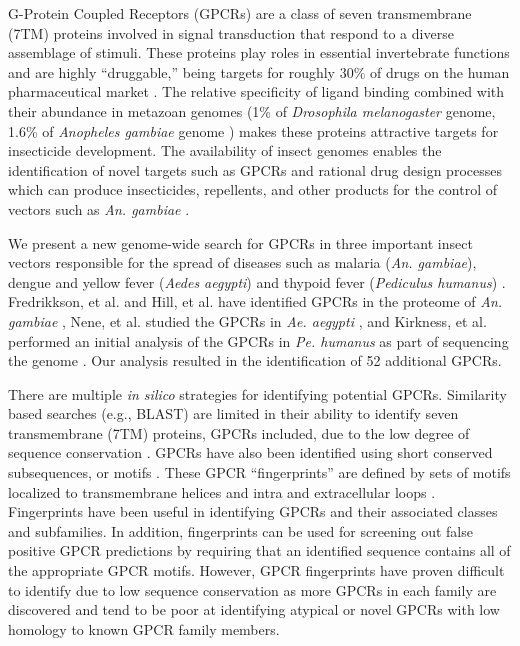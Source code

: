 G-Protein Coupled Receptors (GPCRs) are a class of seven transmembrane (7TM) proteins involved in signal transduction \cite{Pierce2002, Broeck2001} that respond to a diverse assemblage of stimuli.  These proteins play roles in essential invertebrate functions and are highly ``druggable,'' being targets for roughly 30\% of drugs on the human pharmaceutical market \cite{Wise2002}. The relative specificity of ligand binding combined with their abundance in metazoan genomes (1\% of \emph{Drosophila melanogaster} genome, 1.6\% of \emph{Anopheles gambiae} genome \cite{Adams2000, Hill2002}) makes these proteins attractive targets for insecticide development. The availability of insect genomes enables the identification of novel targets such as GPCRs and rational drug design processes which can produce insecticides, repellents, and other products for the control of vectors such as \emph{An. gambiae} \cite{Grimmelikhuijzen2007, Justice2003}.

We present a new genome-wide search for GPCRs in three important insect vectors responsible for the spread of diseases such as malaria (\emph{An. gambiae}), dengue and yellow fever (\emph{Aedes aegypti}) and thypoid fever (\emph{Pediculus humanus}) \cite{Fournier2002, Foucault2006, Grimmelikhuijzen2007}. Fredrikkson, et al. and Hill, et al. have identified GPCRs in the proteome of \emph{An. gambiae} \cite{Fredriksson2005, Hill2002}, Nene, et al. studied the GPCRs in \emph{Ae. aegypti} \cite{Nene2007}, and Kirkness, et al. performed an initial analysis of the GPCRs in \emph{Pe. humanus} as part of sequencing the genome \cite{Kirkness2010}.  Our analysis resulted in the identification of 52 additional GPCRs.

There are multiple \textit{in silico} strategies for identifying potential GPCRs. Similarity based searches (e.g., BLAST) are limited in their ability to identify seven transmembrane (7TM) proteins, GPCRs included, due to the low degree of sequence conservation \cite{Pierce2002, Davies2007}. GPCRs have also been identified using short conserved subsequences, or motifs \cite{Davies2007}. These GPCR ``fingerprints'' are defined by sets of motifs localized to transmembrane helices and intra and extracellular loops \cite{Attwood2001,Flower2004,Huang2003}. Fingerprints have been useful in identifying GPCRs and their associated classes and subfamilies. In addition, fingerprints can be used for screening out false positive GPCR predictions by requiring that an identified sequence contains all of the appropriate GPCR motifs.  However, GPCR fingerprints have proven difficult to identify due to low sequence conservation as more GPCRs in each family are discovered and tend to be poor at identifying atypical or novel GPCRs with low homology to known GPCR family members.

